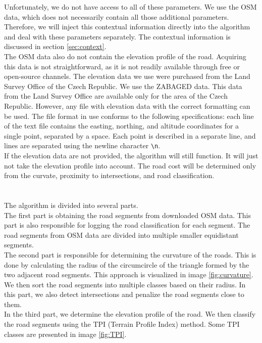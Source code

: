             Unfortunately, we do not have access to all of these parameters. We use the OSM data, which does not necessarily contain all those additional parameters. Therefore, we will inject this contextual information directly into the algorithm and deal with these parameters separately. The contextual information is discussed in section \ref{sec:context}.\\
            The OSM data also do not contain the elevation profile of the road. Acquiring this data is not straightforward, as it is not readily available through free or open-source channels. The elevation data we use were purchased from the Land Survey Office of the Czech Republic. We use the ZABAGED \cite{ZABAGED} data. This data from the Land Survey Office are available only for the area of the Czech Republic. However, any file with elevation data with the correct formatting can be used. The file format in use conforms to the following specifications: each line of the text file contains the easting, northing, and altitude coordinates for a single point, separated by a space. Each point is described in a separate line, and lines are separated using the newline character \texttt{\textbackslash n}.\\
            If the elevation data are not provided, the algorithm will still function. It will just not take the elevation profile into account. The road cost will be determined only from the curvate, proximity to intersections, and road classification.\\\\
        \\
            The algorithm is divided into several parts.\\
            The first part is obtaining the road segments from downloaded OSM data. This part is also responsible for logging the road classification for each segment. The road segments from OSM data are divided into multiple smaller equidistant segments.\\
            The second part is responsible for determining the curvature of the roads. This is done by calculating the radius of the circumcircle of the triangle formed by the two adjacent road segments. This approach is visualized in image \ref{fig:curvature}. We then sort the road segments into multiple classes based on their radius. In this part, we also detect intersections and penalize the road segments close to them.\\
            In the third part, we determine the elevation profile of the road. We then classify the road segments using the TPI (Terrain Profile Index) method. Some TPI classes are presented in image \ref{fig:TPI}.\\
